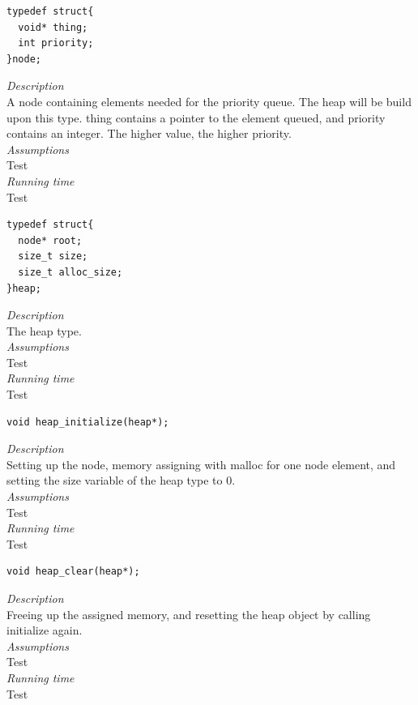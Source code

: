 \documentclass[11pt]{article}
\begin{document}
\begin{lstlisting}[style=customc] 
typedef struct{
  void* thing;
  int priority;
}node;
\end{lstlisting}

\textit{Description}\\
A node containing elements needed for the priority queue. The heap will be build 
upon this type. thing contains a pointer to the element queued, and priority 
contains an integer. The higher value, the higher priority.\\
\textit{Assumptions}\\
Test\\
\textit{Running time}\\
Test



\begin{lstlisting}[style=customc] 
typedef struct{
  node* root;
  size_t size;
  size_t alloc_size;
}heap;
\end{lstlisting} 
\textit{Description}\\
The heap type.\\
\textit{Assumptions}\\
Test\\
\textit{Running time}\\
Test


 \begin{lstlisting}[style=customc] 
void heap_initialize(heap*);\end{lstlisting}

\textit{Description}\\
Setting up the node, memory assigning with malloc for one node element, and setting
the size variable of the heap type to 0.\\
\textit{Assumptions}\\
Test\\
\textit{Running time}\\
Test\\





\begin{lstlisting}[style=customc] 
void heap_clear(heap*); \end{lstlisting} 
\textit{Description}\\
Freeing up the assigned memory, and resetting the heap object by calling initialize again.\\
\textit{Assumptions}\\
Test\\
\textit{Running time}\\
Test
\end{document}
